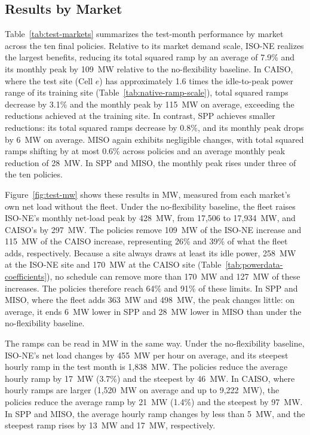 \documentclass{UNCC-thesis}
\begin{document}
\subsection{Results by Market}
\label{subsec:results-test-markets}

Table~\ref{tab:test-markets} summarizes the test-month performance by market across the ten final
policies. Relative to its market demand scale, ISO-NE realizes the largest benefits, reducing its
total squared ramp by an average of 7.9\% and its monthly peak by 109~MW relative to the
no-flexibility baseline. In CAISO, where the test site (Cell \(e\)) has approximately 1.6 times
the idle-to-peak power range of its training site (Table~\ref{tab:native-ramp-scale}), total
squared ramps decrease by 3.1\% and the monthly peak by 115~MW on average, exceeding the
reductions achieved at the training site. In contrast, SPP achieves smaller reductions: its total
squared ramps decrease by 0.8\%, and its monthly peak drops by 6~MW on average. MISO again exhibits
negligible changes, with total squared ramps shifting by at most 0.6\% across policies and an
average monthly peak reduction of 28~MW. In SPP and MISO, the monthly peak rises under three of the
ten policies.

Figure~\ref{fig:test-mw} shows these results in MW, measured from each market's own net load
without the fleet. Under the no-flexibility baseline, the fleet raises ISO-NE's monthly net-load
peak by 428~MW, from 17,506 to 17,934~MW, and CAISO's by 297~MW. The policies remove 109~MW of the
ISO-NE increase and 115~MW of the CAISO increase, representing 26\% and 39\% of what the fleet
adds, respectively. Because a site always draws at least its idle power, 258~MW at the ISO-NE site
and 170~MW at the CAISO site (Table~\ref{tab:powerdata-coefficients}), no schedule can remove more
than 170~MW and 127~MW of these increases. The policies therefore reach 64\% and 91\% of these
limits. In SPP and MISO, where the fleet adds 363~MW and 498~MW, the peak changes little: on
average, it ends 6~MW lower in SPP and 28~MW lower in MISO than under the no-flexibility baseline.

The ramps can be read in MW in the same way. Under the no-flexibility baseline, ISO-NE's net load
changes by 455~MW per hour on average, and its steepest hourly ramp in the test month is
1,838~MW. The policies reduce the average hourly ramp by 17~MW (3.7\%) and the steepest by 46~MW.
In CAISO, where hourly ramps are larger (1,520~MW on average and up to 9,222~MW), the policies
reduce the average ramp by 21~MW (1.4\%) and the steepest by 97~MW. In SPP and MISO, the average
hourly ramp changes by less than 5~MW, and the steepest ramp rises by 13~MW and 17~MW,
respectively.
\end{document}
